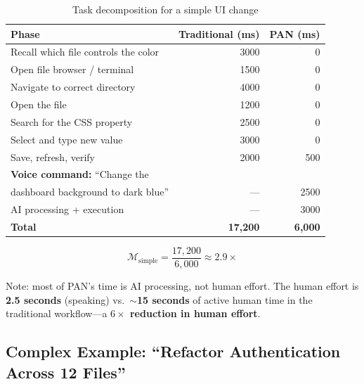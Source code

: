 \documentclass[11pt, a4paper]{article}
\begin{document}
\begin{table}[h]
\centering
\begin{tabular}{@{}lrr@{}}
\toprule
\textbf{Phase} & \textbf{Traditional (ms)} & \textbf{PAN (ms)} \\
\midrule
Recall which file controls the color  & 3000 & 0 \\
Open file browser / terminal          & 1500 & 0 \\
Navigate to correct directory          & 4000 & 0 \\
Open the file                          & 1200 & 0 \\
Search for the CSS property            & 2500 & 0 \\
Select and type new value              & 3000 & 0 \\
Save, refresh, verify                  & 2000 & 500 \\
\midrule
\textbf{Voice command:} ``Change the    &       &      \\
\quad dashboard background to dark blue'' & --- & 2500 \\
AI processing + execution              & ---  & 3000 \\
\midrule
\textbf{Total}                         & \textbf{17,200} & \textbf{6,000} \\
\bottomrule
\end{tabular}
\caption{Task decomposition for a simple UI change}
\label{tab:example1}
\end{table}

\begin{equation}
  \mathcal{M}_{\text{simple}} = \frac{17{,}200}{6{,}000} \approx 2.9\times
\end{equation}

Note: most of PAN's time is AI processing, not human effort. The human effort is
\textbf{2.5 seconds} (speaking) vs.\ \textbf{$\sim$15 seconds} of active human
time in the traditional workflow---a \textbf{$6\times$ reduction in human effort}.

\subsection{Complex Example: ``Refactor Authentication Across 12 Files''}
\end{document}
